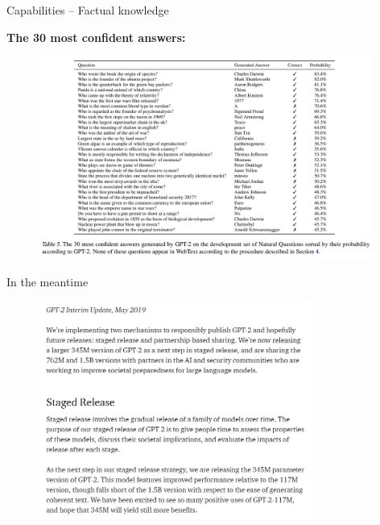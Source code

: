 
\begin{frame}{Capabilities -- Factual knowledge}

\vfill

\textbf{The 30 most confident answers:}

\begin{figure}
\centering
\includegraphics[width = 11cm]{figure/72-gpt2-qa.png}\\ 
\end{figure}

\vfill

\end{frame}


\begin{frame}{In the meantime}

\vfill

\begin{figure}
\centering
\includegraphics[width = 9cm]{figure/72-gpt2-release2.png}\\ 
\end{figure}

\vfill

\end{frame}

